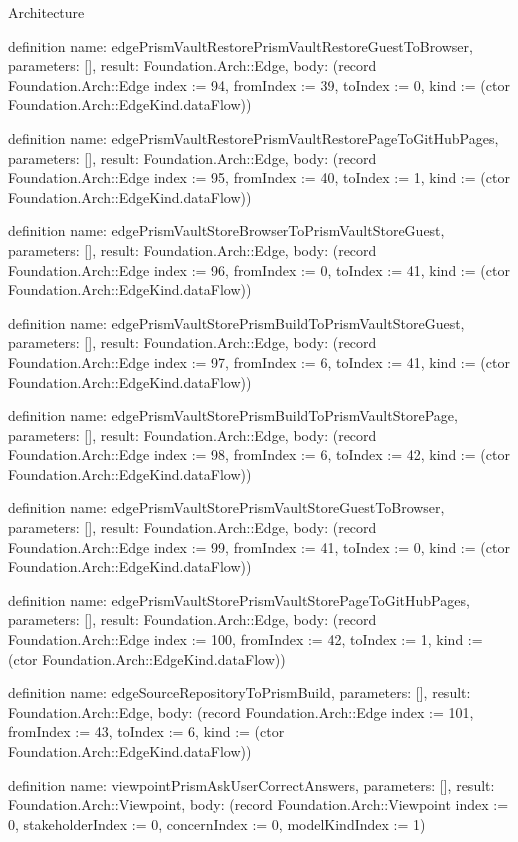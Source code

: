 \begin{lexlean}{Architecture}
\begin{semanticmodule}
definition{
  name: edgePrismVaultRestorePrismVaultRestoreGuestToBrowser,
  parameters: [],
  result: Foundation.Arch::Edge,
  body: (record Foundation.Arch::Edge {index := 94, fromIndex := 39, toIndex := 0, kind := (ctor Foundation.Arch::EdgeKind.dataFlow)})
}

definition{
  name: edgePrismVaultRestorePrismVaultRestorePageToGitHubPages,
  parameters: [],
  result: Foundation.Arch::Edge,
  body: (record Foundation.Arch::Edge {index := 95, fromIndex := 40, toIndex := 1, kind := (ctor Foundation.Arch::EdgeKind.dataFlow)})
}

definition{
  name: edgePrismVaultStoreBrowserToPrismVaultStoreGuest,
  parameters: [],
  result: Foundation.Arch::Edge,
  body: (record Foundation.Arch::Edge {index := 96, fromIndex := 0, toIndex := 41, kind := (ctor Foundation.Arch::EdgeKind.dataFlow)})
}

definition{
  name: edgePrismVaultStorePrismBuildToPrismVaultStoreGuest,
  parameters: [],
  result: Foundation.Arch::Edge,
  body: (record Foundation.Arch::Edge {index := 97, fromIndex := 6, toIndex := 41, kind := (ctor Foundation.Arch::EdgeKind.dataFlow)})
}

definition{
  name: edgePrismVaultStorePrismBuildToPrismVaultStorePage,
  parameters: [],
  result: Foundation.Arch::Edge,
  body: (record Foundation.Arch::Edge {index := 98, fromIndex := 6, toIndex := 42, kind := (ctor Foundation.Arch::EdgeKind.dataFlow)})
}

definition{
  name: edgePrismVaultStorePrismVaultStoreGuestToBrowser,
  parameters: [],
  result: Foundation.Arch::Edge,
  body: (record Foundation.Arch::Edge {index := 99, fromIndex := 41, toIndex := 0, kind := (ctor Foundation.Arch::EdgeKind.dataFlow)})
}

definition{
  name: edgePrismVaultStorePrismVaultStorePageToGitHubPages,
  parameters: [],
  result: Foundation.Arch::Edge,
  body: (record Foundation.Arch::Edge {index := 100, fromIndex := 42, toIndex := 1, kind := (ctor Foundation.Arch::EdgeKind.dataFlow)})
}

definition{
  name: edgeSourceRepositoryToPrismBuild,
  parameters: [],
  result: Foundation.Arch::Edge,
  body: (record Foundation.Arch::Edge {index := 101, fromIndex := 43, toIndex := 6, kind := (ctor Foundation.Arch::EdgeKind.dataFlow)})
}

definition{
  name: viewpointPrismAskUserCorrectAnswers,
  parameters: [],
  result: Foundation.Arch::Viewpoint,
  body: (record Foundation.Arch::Viewpoint {index := 0, stakeholderIndex := 0, concernIndex := 0, modelKindIndex := 1})
}


\end{semanticmodule}
\end{lexlean}
